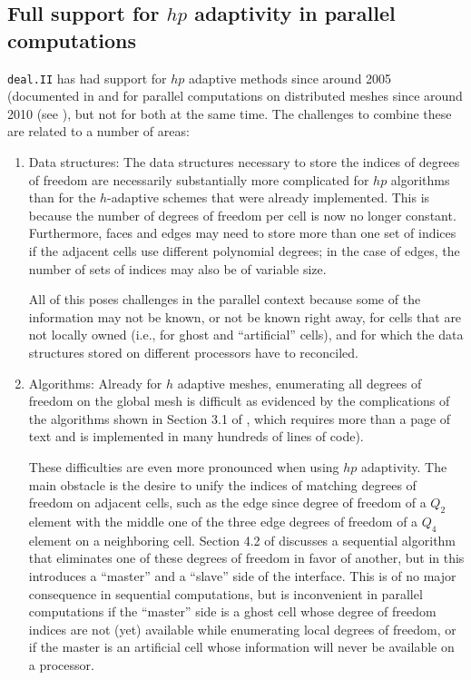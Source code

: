 \documentclass{ansarticle-preprint}
\newcommand{\specialword}[1]{\texttt{#1}}
\newcommand{\dealii}{{\specialword{deal.II}}\xspace}
\begin{document}
\subsection{Full support for $hp$ adaptivity in parallel computations}

\dealii{} has had support for $hp$ adaptive methods since around 2005
(documented in \cite{BangerthKayserHerold2007} and for parallel
computations on distributed meshes since around 2010 (see
\cite{BangerthBursteddeHeisterKronbichler11}), but not for both at the
same time. The challenges to combine these are related to a number of
areas:
\begin{enumerate}
\item Data structures: The data structures necessary to store the
  indices of degrees of freedom are necessarily substantially more
  complicated for $hp$ algorithms than for the $h$-adaptive schemes
  that were already implemented. This is because the number of degrees
  of freedom per cell is now no longer constant. Furthermore,
  faces and edges may need to store more than one set of indices if
  the adjacent cells use different polynomial degrees; in the case of
  edges, the number of sets of indices may also be of variable size.

  All of this poses challenges in the parallel context because some of
  the information may not be known, or not be known right away, for
  cells that are not locally owned (i.e., for ghost and ``artificial''
  cells), and for which the data structures stored on different
  processors have to reconciled.
  
\item Algorithms: Already for $h$ adaptive meshes, enumerating all
  degrees of freedom on the global mesh is difficult as evidenced by
  the complications of the algorithms shown in Section 3.1 of
  \cite{BangerthBursteddeHeisterKronbichler11}, which requires more
  than a page of text and is implemented in many hundreds of lines of
  code).

  These difficulties are even more pronounced when using $hp$
  adaptivity. The main obstacle is the desire to unify the indices of
  matching degrees of freedom on adjacent cells, such as the edge
  since degree of freedom of a $Q_2$ element with the middle one of
  the three edge degrees of freedom of a $Q_4$ element on a
  neighboring cell. Section 4.2 of
  \cite{BangerthKayserHerold2007} discusses a sequential algorithm
  that eliminates one of these degrees of freedom in favor of another,
  but in this introduces a ``master'' and a ``slave'' side of the
  interface. This is of no major consequence in sequential
  computations, but is inconvenient in parallel computations if the
  ``master'' side is a ghost cell whose degree of freedom indices are
  not (yet) available while enumerating local degrees of freedom, or
  if the master is an artificial cell whose information will never be
  available on a processor.


\end{enumerate}
\end{document}
